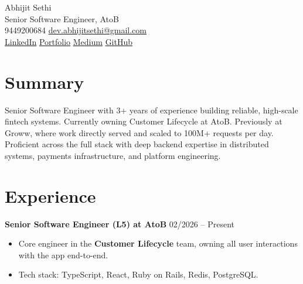 \documentclass[a4paper,11pt]{article}
\begin{document}
\begin{center}
    {\huge Abhijit Sethi} \\[0.2cm]
    {\large Senior Software Engineer, AtoB} \\[0.4cm]

    \faPhone \hspace{1mm} 9449200684 \hspace{5mm}
    \faEnvelope \hspace{1mm} \href{mailto:dev.abhijitsethi@gmail.com}{dev.abhijitsethi@gmail.com} \\[0.2cm]

    \faLinkedinSquare \hspace{1mm} \href{https://www.linkedin.com/in/abhijit-sethi/}{LinkedIn} \hspace{5mm}
    \faGlobe \hspace{1mm} \href{https://abhijit-sethi.github.io}{Portfolio} \hspace{5mm}
    \faGlobe \hspace{1mm} \href{https://medium.com/@AbhijitSethi}{Medium} \hspace{5mm}
    \faGithubSquare \hspace{1mm} \href{https://github.com/Abhijit-Sethi}{GitHub}
\end{center}

\section*{Summary}
Senior Software Engineer with 3+ years of experience building reliable, high-scale fintech systems. Currently owning Customer Lifecycle at AtoB. Previously at Groww, where work directly served and scaled to 100M+ requests per day. Proficient across the full stack with deep backend expertise in distributed systems, payments infrastructure, and platform engineering.

\section*{Experience}

\noindent\textbf{Senior Software Engineer (L5) at AtoB} \hfill 02/2026 -- Present
\begin{itemize}[noitemsep,topsep=0pt,parsep=0pt,partopsep=0pt]
    \item Core engineer in the \textbf{Customer Lifecycle} team, owning all user interactions with the app end-to-end.
    \item Tech stack: TypeScript, React, Ruby on Rails, Redis, PostgreSQL.
\end{itemize}
\end{document}
